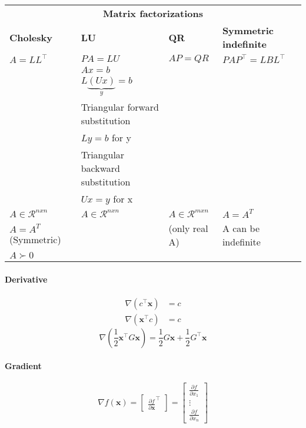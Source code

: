 
\hskip-0.5cm
\begin{tabularx}{\linewidth}{X X X X}
	\multicolumn{4}{c}{\textbf{Matrix factorizations}} \\
	\textbf{Cholesky} & \textbf{LU} & \textbf{QR} & \textbf{Symmetric indefinite}\\
	\hline
	$A = LL^\top$ & $PA = LU$ & $AP = QR$ & $PAP^\top = LBL^\top$\\ %
	\hline
	& $Ax = b$ & &\\
	& $L\underbrace{(Ux)}_{y} = b$ & &\\
	& Triangular forward substitution & &\\
	& $Ly = b$ for y & &\\
	& Triangular backward substitution & &\\
	& $Ux = y$ for x & &\\
	\hline
	$A \in \mathcal{R}^{nxn}$ & $A \in \mathcal{R}^{nxn}$ & $A \in \mathcal{R}^{mxn}$ & $A=A^T$\\
	$A=A^T$ (Symmetric) & & (only real A) & A can be indefinite\\
	$A \succ 0$ & & & \\
\end{tabularx}


\paragraph{Derivative}
\begin{equation}
\begin{split}
  \nabla(c^\top \mathbf{x}) &= c\\
  \nabla(\mathbf{x}^\top c) &= c
\end{split}
\end{equation}
%
\begin{equation}
  \nabla \left( \frac{1}{2} \mathbf{x}^\top G \mathbf{x} \right) = \frac{1}{2}G \mathbf{x} + \frac{1}{2}G^\top \mathbf{x}
\end{equation}

\paragraph{Gradient}
\begin{equation}
  \nabla f(\mathbf{x}) = \begin{bmatrix} \frac{\partial f}{\partial \mathbf{x}}^\top \end{bmatrix}
  = \begin{bmatrix}
  \frac{\partial f}{\partial x_1}\\
  \vdots\\
  \frac{\partial f}{\partial x_n}
  \end{bmatrix}
\end{equation}

